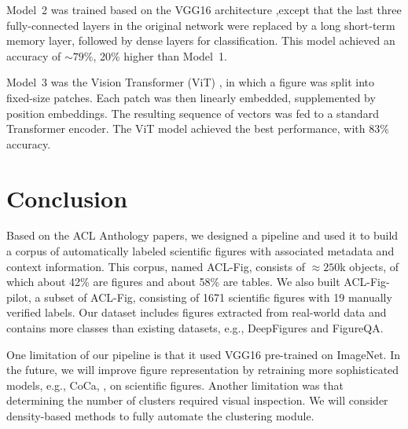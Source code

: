 \documentclass{article}
\newcommand{\scifig}{{\sc ACL-Fig}}
\newcommand{\scifigp}{{\sc ACL-Fig-pilot}}
\begin{document}
Model~2 was trained based on the VGG16 architecture ,except that the last three fully-connected layers in the original network were replaced by a long short-term memory layer, followed by dense layers for classification. This model achieved an accuracy of $\sim79\%$, 20\% higher than Model~1. 

Model~3 was the Vision Transformer (ViT) \cite{dosovitskiy2020image}, in which a figure was split into fixed-size patches. Each patch was then linearly embedded, supplemented by position embeddings. The resulting sequence of vectors was fed to a standard Transformer encoder.  The ViT model achieved the best performance, with 83\% accuracy. 


\section{Conclusion}
Based on the ACL Anthology papers, we designed a pipeline and used it to build a corpus of automatically labeled scientific figures with associated metadata and context information. This corpus, named \scifig, consists of $\approx250$k objects, of which about 42\% are figures and about 58\% are tables. We also built \scifigp, a subset of \scifig, consisting of 1671 scientific figures with 19 manually verified labels. Our dataset includes figures extracted from real-world data and contains more classes than existing datasets, e.g., DeepFigures and FigureQA. 

One limitation of our pipeline is that it used VGG16 pre-trained on ImageNet. In the future, we will improve  figure representation by retraining more sophisticated models, e.g., CoCa, \cite{yu2022coca}, on scientific figures. Another limitation was that determining the number of clusters required visual inspection. We will consider density-based methods  %
to fully automate the clustering module. 

  


%   
%   
\end{document}
